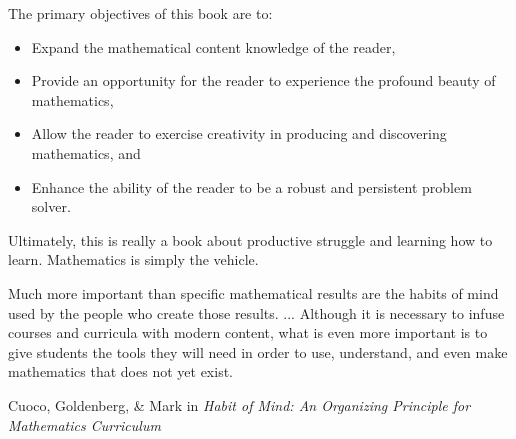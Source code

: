 The primary objectives of this book are to:
\begin{itemize}
\item Expand the mathematical content knowledge of the reader,
\item Provide an opportunity for the reader to experience the profound beauty of mathematics,
\item Allow the reader to exercise creativity in producing and discovering mathematics, and
\item Enhance the ability of the reader to be a robust and persistent problem solver.
\end{itemize}
Ultimately, this is really a book about productive struggle and learning how to learn. Mathematics is simply the vehicle.

\epigraph{Much more important than specific mathematical results are the habits of mind used by the people who create those results. ... Although it is necessary to infuse courses and curricula with modern content, what is even more important is to give students the tools they will need in order to use, understand, and even make mathematics that does not yet exist.}{Cuoco, Goldenberg, \& Mark in \emph{Habit of Mind: An Organizing Principle for Mathematics Curriculum}}